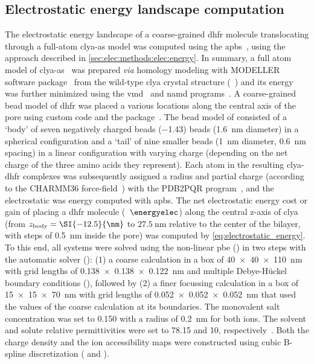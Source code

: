 \subsection{Electrostatic energy landscape computation}
%
The electrostatic energy landscape of a coarse-grained \gls{dhfr} molecule translocating through a full-atom
\gls{clya-as} model was computed using the \gls{apbs}~\cite{Baker-2001}, using the approach described in
\cref{sec:elec:methods:elec:energy}. In summary, a full atom model of \gls{clya-as}~\cite{Franceschini-2016}
was prepared \textit{via} homology modeling with MODELLER software package~\cite{Sali-1993} from the wild-type
\gls{clya} crystal structure (~\cite{Mueller-2009}) and its energy was further minimized using the
\gls{vmd}~\cite{Humphrey-1996} and \gls{namd} programs~\cite{Phillips-2005}. A coarse-grained bead model of
\gls{dhfr} was placed a various locations along the central axis of the pore using custom  code
and the  package~\cite{Cock-2009}. The bead model of \DHFRt{} consisted of a `body' of seven
negatively charged beads  (\SI{-1.43}{\ec}) beads (\SI{1.6}{\nm} diameter) in a spherical configuration and a
`tail' of nine smaller beads (\SI{1}{\nm} diameter, \SI{0.6}{\nm} spacing) in a linear configuration with
varying charge (depending on the net charge of the three amino acids they represent). Each atom in the
resulting \gls{clya}-\gls{dhfr} complexes was subsequently assigned a radius and partial charge (according to
the CHARMM36 force-field~\cite{Huang-2013}) with the PDB2PQR program~\cite{Dolinsky-2004,Dolinsky-2007}, and
the electrostatic was energy computed with \gls{apbs}. The net electrostatic energy cost or gain of placing a
\gls{dhfr} molecule (\ie~$\energyelec$) along the central z-axis of \gls{clya} (from
$z_{\rm{body}}=\SI{-12.5}{\nm}$ to $\SI{27.5}{\nm}$ relative to the center of the bilayer, with steps of
\SI{0.5}{\nm} inside the pore) was computed by \cref{eq:electrostatic_energy}. To this end, all systems were
solved using the non-linear \gls{pbe} () in two steps with the automatic solver ():
(1) a coarse calculation in a box of \SI{40x40x110}{\nm} with grid lengths of \SI{0.138x0.138x0.122}{\nm} and
multiple Debye-H\"{u}ckel boundary conditions (), followed by (2) a finer focussing calculation
in a box of \SI{15x15x70}{\nm} with grid lengths of \SI{0.052x0.052x0.052}{\nm} that used the values of the
coarse calculation at its boundaries. The monovalent salt concentration was set to \SI{0.150}{\Molar} with a
radius of \SI{0.2}{\nm} for both ions. The solvent and solute relative permittivities were set to \num{78.15}
and \num{10}, respectively~\cite{Li-2013}. Both the charge density and the ion accessibility maps were
constructed using cubic B-spline discretization ( and ).


